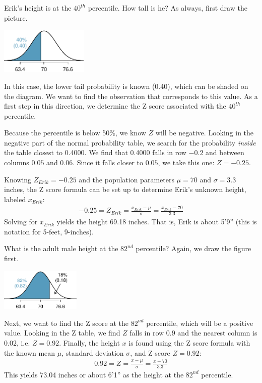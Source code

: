 \begin{example}{Erik's height is at the $40^{th}$ percentile. How tall is he?}\label{normalExam40Perc}
As always, first draw the picture.\vspace{-1mm}
\begin{center}
\includegraphics[height=22mm]{02/figures/height40Perc/height40Perc}\vspace{-1mm}
\end{center}
In this case, the lower tail probability is known (0.40), which can be shaded on the diagram. We want to find the observation that corresponds to this value. As a first step in this direction, we determine the Z score associated with the $40^{th}$ percentile.

Because the percentile is below 50\%, we know $Z$ will be negative. Looking in the negative part of the normal probability table, we search for the probability \emph{inside} the table closest to 0.4000. We find that 0.4000 falls in row $-0.2$ and between columns $0.05$ and $0.06$. Since it falls closer to $0.05$, we take this one: $Z=-0.25$.

Knowing $Z_{Erik}=-0.25$ and the population parameters $\mu=70$ and $\sigma=3.3$ inches, the Z score formula can be set up to determine Erik's unknown height, labeled $x_{Erik}$:
\begin{eqnarray*}
-0.25 = Z_{Erik} = \frac{x_{Erik} - \mu}{\sigma} = \frac{x_{Erik} - 70}{3.3}
\end{eqnarray*}
Solving for $x_{Erik}$ yields the height 69.18 inches. That is, Erik is about 5'9'' (this is notation for 5-feet, 9-inches).
\end{example}

\begin{example}{What is the adult male height at the $82^{nd}$ percentile?}
Again, we draw the figure first.\vspace{-3mm}
\begin{center}
\includegraphics[height=20mm]{02/figures/height82Perc/height82Perc}\vspace{-2mm}
\end{center}
Next, we want to find the Z score at the $82^{nd}$ percentile, which will be a positive value. Looking in the Z table, we find $Z$ falls in row $0.9$ and the nearest column is $0.02$, i.e. $Z=0.92$. Finally, the height $x$ is found using the Z score formula with the known mean $\mu$, standard deviation $\sigma$, and Z score $Z=0.92$:
\begin{eqnarray*}
0.92 = Z = \frac{x-\mu}{\sigma} = \frac{x - 70}{3.3}
\end{eqnarray*}
This yields 73.04 inches or about 6'1'' as the height at the $82^{nd}$ percentile.
\end{example}


